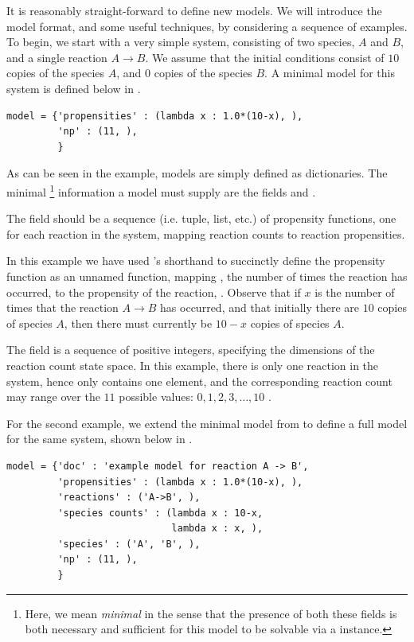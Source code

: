 It is reasonably straight-forward to define new models.
We will introduce the model format, and some useful techniques, by considering a
sequence of examples.
To begin, we start with a very simple system, consisting of two species, $A$
and $B$, and a single reaction $A \rightarrow B$. We assume that the initial
conditions consist of $10$ copies of the species $A$, and $0$ copies of the
species $B$. A minimal model for this system is defined below in
.

\begin{lstlisting}[frame=tb,
caption={A minimal model definition for the system $A \rightarrow B$.},
label=model1a]
model = {'propensities' : (lambda x : 1.0*(10-x), ),
         'np' : (11, ),
         }
\end{lstlisting}

As can be seen in the example, models are simply defined as
\python{} dictionaries. The minimal
\footnote
{
	Here, we mean \emph{minimal} in the sense that the presence of
	both these fields is both necessary and sufficient
	for this model to be solvable via a
	instance.
}
information a model must supply
are the fields  and .

The field 
should be a sequence (i.e. tuple, list, etc.) of propensity functions, one
for each reaction in the system, mapping reaction counts to reaction
propensities.

In this example we have used \python{}'s 
shorthand to succinctly define the propensity function as an unnamed function,
mapping , the number of times the reaction has occurred, to the
propensity of the reaction, . Observe that if $x$ is the
number of times that the reaction $A \rightarrow B$ has occurred, and that
initially there are $10$ copies of species $A$, then there must currently be $10-x$ copies of
species $A$.

The field  is a sequence of positive integers,
specifying the dimensions of the reaction count state space. In this example,
there is only one reaction in the system, hence  only contains one
element, and the corresponding reaction count may range over the $11$ possible
values: $0, 1, 2, 3, \ldots, 10$ .

For the second example, we extend the minimal model from 
to define a full model for the same system, shown below in .

\begin{lstlisting}[frame=tb,
caption={A full model definition for the system $A \rightarrow B$.},
label=model1b]
model = {'doc' : 'example model for reaction A -> B',
         'propensities' : (lambda x : 1.0*(10-x), ),
         'reactions' : ('A->B', ),
         'species counts' : (lambda x : 10-x,
                             lambda x : x, ),
         'species' : ('A', 'B', ),
         'np' : (11, ),
         }
\end{lstlisting}

